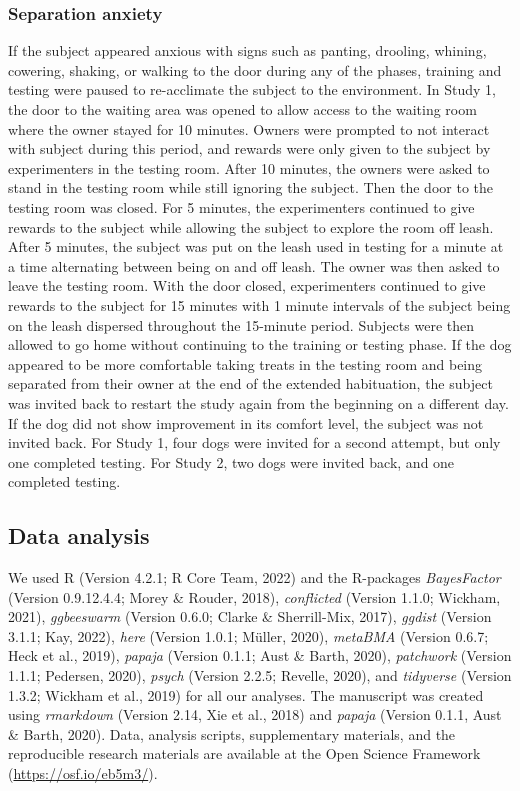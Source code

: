 \documentclass[
  pub,floatsintext]{apa6}
\begin{document}
\hypertarget{separation-anxiety}{%
\subsubsection{Separation anxiety}\label{separation-anxiety}}

If the subject appeared anxious with signs such as panting, drooling, whining, cowering, shaking, or walking to the door during any of the phases, training and testing were paused to re-acclimate the subject to the environment. In Study 1, the door to the waiting area was opened to allow access to the waiting room where the owner stayed for 10 minutes. Owners were prompted to not interact with subject during this period, and rewards were only given to the subject by experimenters in the testing room. After 10 minutes, the owners were asked to stand in the testing room while still ignoring the subject. Then the door to the testing room was closed. For 5 minutes, the experimenters continued to give rewards to the subject while allowing the subject to explore the room off leash. After 5 minutes, the subject was put on the leash used in testing for a minute at a time alternating between being on and off leash. The owner was then asked to leave the testing room. With the door closed, experimenters continued to give rewards to the subject for 15 minutes with 1 minute intervals of the subject being on the leash dispersed throughout the 15-minute period. Subjects were then allowed to go home without continuing to the training or testing phase. If the dog appeared to be more comfortable taking treats in the testing room and being separated from their owner at the end of the extended habituation, the subject was invited back to restart the study again from the beginning on a different day. If the dog did not show improvement in its comfort level, the subject was not invited back. For Study 1, four dogs were invited for a second attempt, but only one completed testing. For Study 2, two dogs were invited back, and one completed testing.

\hypertarget{data-analysis}{%
\subsection{Data analysis}\label{data-analysis}}

We used R (Version 4.2.1; R Core Team, 2022) and the R-packages \emph{BayesFactor} (Version 0.9.12.4.4; Morey \& Rouder, 2018), \emph{conflicted} (Version 1.1.0; Wickham, 2021), \emph{ggbeeswarm} (Version 0.6.0; Clarke \& Sherrill-Mix, 2017), \emph{ggdist} (Version 3.1.1; Kay, 2022), \emph{here} (Version 1.0.1; Müller, 2020), \emph{metaBMA} (Version 0.6.7; Heck et al., 2019), \emph{papaja} (Version 0.1.1; Aust \& Barth, 2020), \emph{patchwork} (Version 1.1.1; Pedersen, 2020), \emph{psych} (Version 2.2.5; Revelle, 2020), and \emph{tidyverse} (Version 1.3.2; Wickham et al., 2019) for all our analyses. The manuscript was created using \emph{rmarkdown} (Version 2.14, Xie et al., 2018) and \emph{papaja} (Version 0.1.1, Aust \& Barth, 2020). Data, analysis scripts, supplementary materials, and the reproducible research materials are available at the Open Science Framework (\url{https://osf.io/eb5m3/}).
\end{document}
